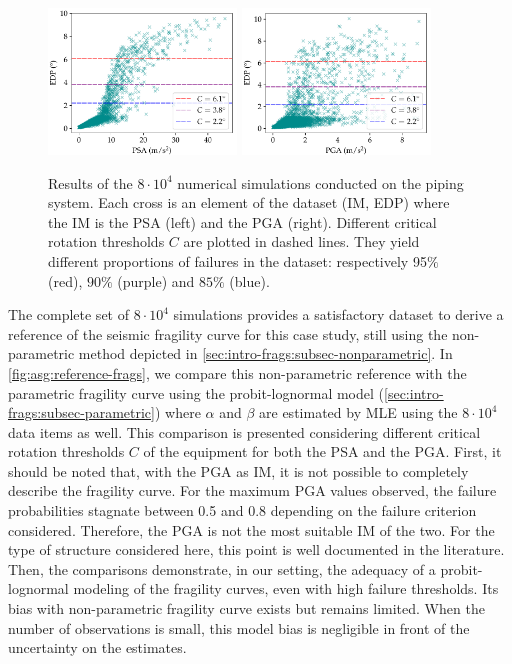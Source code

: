     \begin{figure}[h]
        \centering%
        \includegraphics[width=5cm]{figures/intro-frags/asg/cloud_PSA_light.pdf}%
        \includegraphics[width=5cm]{figures/intro-frags/asg/cloud_PGA_light.pdf}%
        \caption{Results of the $8\cdot10^4$ numerical simulations conducted on the piping system. Each cross is an element of the dataset (IM, EDP) where the IM is the PSA (left) and the PGA (right). Different critical rotation thresholds $C$ are plotted in dashed lines. They yield different proportions of failures in the dataset: respectively 95$\%$ (red), $90\%$ (purple) and $85\%$ (blue).}
        \label{fig:asg:scattersIMs}
        \end{figure}
    
    The complete set of $8\cdot 10^4$ simulations provides a satisfactory dataset to derive a reference of the seismic fragility curve for this case study, still using the non-parametric method depicted in \cref{sec:intro-frags:subsec-nonparametric}.
    In \cref{fig:asg:reference-frags}, we compare this non-parametric reference with the parametric fragility curve using the probit-lognormal model (\cref{sec:intro-frags:subsec-parametric}) where $\alpha$ and $\beta$ are estimated by MLE using the $8\cdot 10^4$ data items as well. {This comparison is presented considering different critical rotation thresholds $ C $ of the equipment for both the PSA and the PGA. First, it should be noted that, with the PGA as IM, it is not possible to completely describe the fragility curve. For the maximum PGA values observed, the failure probabilities stagnate between 0.5 and 0.8 depending on the failure criterion considered. Therefore, the PGA is not the most suitable IM of the two. For the type of structure considered here, this point is well documented in the literature. Then, the comparisons demonstrate, in our setting, the adequacy of a probit-lognormal modeling of the fragility curves, even with high failure thresholds.} Its bias with non-parametric fragility curve exists but remains limited. When the number of observations is small, this model bias is negligible in front of the uncertainty on the estimates.


